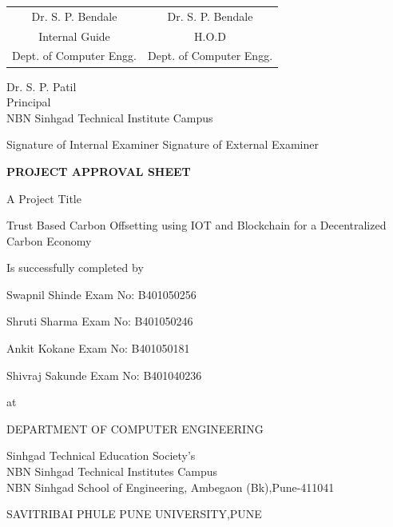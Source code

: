 \documentclass[oneside,a4paper,12pt]{book}
\renewcommand{\arraystretch}{1.5}
\begin{document}
\bgroup
\def\arraystretch{0.7}
\vspace*{1\baselineskip}
\begin{tabular}{c c }
Dr. S. P. Bendale &  \hspace{50 mm} Dr. S. P. Bendale \\								
Internal Guide   &  \hspace{50 mm} H.O.D \\
Dept. of Computer Engg.  &	\hspace{50 mm}Dept. of Computer Engg.  \\
\end{tabular}
\vspace*{1\baselineskip} 
\begin{center}
{
Dr. S. P. Patil \\
Principal\\
NBN Sinhgad Technical Institute Campus   
}
\end{center}
\vspace*{1.5\baselineskip}
Signature of Internal Examiner \hspace{30 mm} Signature of External Examiner
\newpage
\begin{center}
\textbf{PROJECT APPROVAL SHEET}
\end{center}
\begin{center}
 A Project Title
 \end{center} 
\begin{center}
Trust Based Carbon Offsetting using IOT and Blockchain for a Decentralized Carbon Economy
\end{center}
\begin{center}
Is successfully completed by 
\end{center}
\centerline{Swapnil Shinde  \hspace{27 mm} Exam No: B401050256 } 
\centerline{Shruti Sharma \hspace{21 mm} Exam No: B401050246}
\centerline{Ankit Kokane \hspace{24 mm} Exam No: B401050181 } 
\centerline{Shivraj Sakunde \hspace{24 mm} Exam No: B401040236 } 

\begin{center}
 at
 \end{center} 
 \begin{center}
 DEPARTMENT OF COMPUTER ENGINEERING
 \end{center}
 \begin{center}
Sinhgad Technical Education Society's \\
NBN Sinhgad Technical Institutes Campus \\
NBN Sinhgad School of Engineering, Ambegaon (Bk),Pune-411041\\
 \end{center}
 \begin{center}
 SAVITRIBAI PHULE PUNE UNIVERSITY,PUNE
 \end{center}
 
\end{document}
